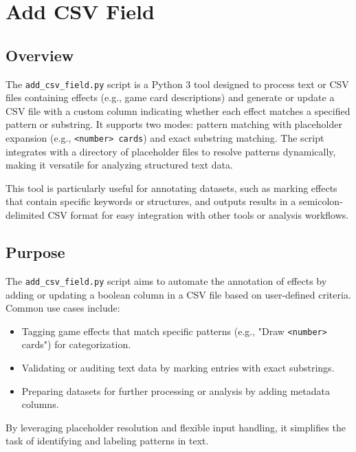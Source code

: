 \section{Add CSV Field}
\subsection{Overview}
The \texttt{add\_csv\_field.py} script is a Python 3 tool designed to process text or CSV files containing effects (e.g., game card descriptions) and generate or update a CSV file with a custom column indicating whether each effect matches a specified pattern or substring. It supports two modes: pattern matching with placeholder expansion (e.g., \texttt{<number> cards}) and exact substring matching. The script integrates with a directory of placeholder files to resolve patterns dynamically, making it versatile for analyzing structured text data.

This tool is particularly useful for annotating datasets, such as marking effects that contain specific keywords or structures, and outputs results in a semicolon-delimited CSV format for easy integration with other tools or analysis workflows.

\subsection{Purpose}
The \texttt{add\_csv\_field.py} script aims to automate the annotation of effects by adding or updating a boolean column in a CSV file based on user-defined criteria. Common use cases include:
\begin{itemize}
    \item Tagging game effects that match specific patterns (e.g., "Draw \texttt{<number>} cards") for categorization.
    \item Validating or auditing text data by marking entries with exact substrings.
    \item Preparing datasets for further processing or analysis by adding metadata columns.
\end{itemize}
By leveraging placeholder resolution and flexible input handling, it simplifies the task of identifying and labeling patterns in text.

